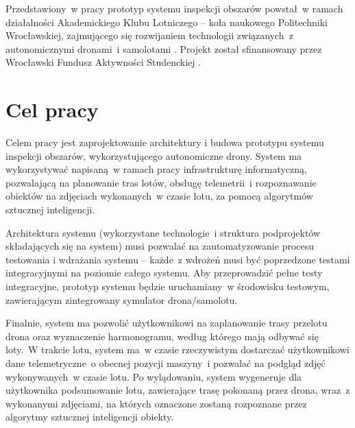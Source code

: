 Przedstawiony~w pracy prototyp systemu inspekcji obszarów powstał~w ramach działalności
Akademickiego Klubu Lotniczego -- koła naukowego Politechniki Wrocławskiej, zajmującego
się rozwijaniem technologii związanych~z autonomicznymi dronami~i samolotami
\cite{akl_home_page}. Projekt został sfinansowany przez Wrocławski Fundusz
Aktywności Studenckiej \cite{fast_webpage}.


\section{Cel pracy} \label{intro_objective}

Celem pracy jest zaprojektowanie architektury i budowa prototypu systemu inspekcji obszarów,
wykorzystującego autonomiczne drony. %
System ma wykorzystywać napisaną~w ramach pracy
infrastrukturę informatyczną, pozwalającą na planowanie tras lotów, obsługę telemetrii~i
rozpoznawanie obiektów na zdjęciach wykonanych~w czasie lotu, za pomocą algorytmów
sztucznej inteligencji. 

Architektura systemu (wykorzystane technologie~i struktura podprojektów składających
się na system) musi pozwalać na zautomatyzowanie procesu testowania i wdrażania systemu
 -- każde~z wdrożeń musi być poprzedzone testami integracyjnymi na poziomie całego systemu.
Aby przeprowadzić pełne testy integracyjne, prototyp systemu będzie uruchamiany~w
środowisku testowym, zawierającym zintegrowany symulator drona/samolotu.

Finalnie, system ma pozwolić użytkownikowi na zaplanowanie trasy przelotu drona
oraz wyznaczenie harmonogramu, według którego mają odbywać się loty.~W trakcie 
lotu, system ma~w czasie rzeczywistym dostarczać użytkownikowi dane telemetryczne~o
obecnej pozycji maszyny~i pozwalać na podgląd zdjęć wykonywanych~w czasie lotu.
Po wylądowaniu, system wygeneruje dla użytkownika podsumowanie lotu, zawierające
trasę pokonaną przez drona, wraz~z wykonanymi zdjęciami, na których oznaczone zostaną
rozpoznane przez algorytmy sztucznej inteligencji obiekty.

